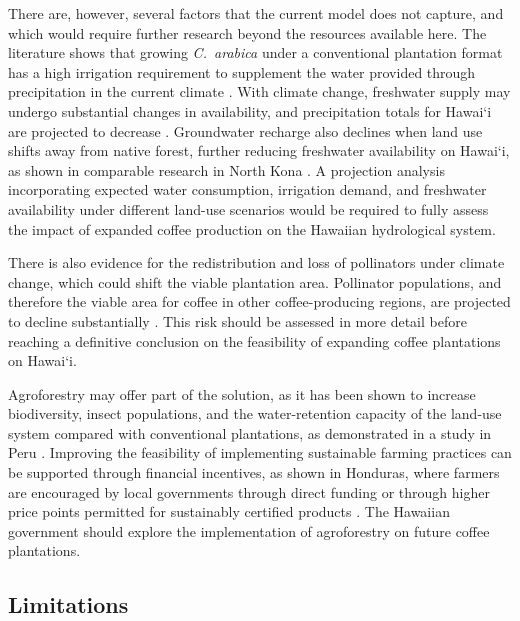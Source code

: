 \documentclass[12pt,a4paper]{article}
\newcommand{\okina}{\textquoteleft}
\begin{document}
There are, however, several factors that the current model does not capture, and which would require further research beyond the resources available here. The literature shows that growing \textit{C.~arabica} under a conventional plantation format has a high irrigation requirement to supplement the water provided through precipitation in the current climate \citep{DaMatta2006}. With climate change, freshwater supply may undergo substantial changes in availability, and precipitation totals for Hawai\okina i are projected to decrease \citep{Timm2015}. Groundwater recharge also declines when land use shifts away from native forest, further reducing freshwater availability on Hawai\okina i, as shown in comparable research in North Kona \citep{Bremer2018}. A projection analysis incorporating expected water consumption, irrigation demand, and freshwater availability under different land-use scenarios would be required to fully assess the impact of expanded coffee production on the Hawaiian hydrological system.

There is also evidence for the redistribution and loss of pollinators under climate change, which could shift the viable plantation area. Pollinator populations, and therefore the viable area for coffee in other coffee-producing regions, are projected to decline substantially \citep{Imbach2017}. This risk should be assessed in more detail before reaching a definitive conclusion on the feasibility of expanding coffee plantations on Hawai\okina i.

Agroforestry may offer part of the solution, as it has been shown to increase biodiversity, insect populations, and the water-retention capacity of the land-use system compared with conventional plantations, as demonstrated in a study in Peru \citep{GrandezAlberca2025}. Improving the feasibility of implementing sustainable farming practices can be supported through financial incentives, as shown in Honduras, where farmers are encouraged by local governments through direct funding or through higher price points permitted for sustainably certified products \citep{QuinonezCamarillo2025}. The Hawaiian government should explore the implementation of agroforestry on future coffee plantations.

\subsection{Limitations}
\end{document}
